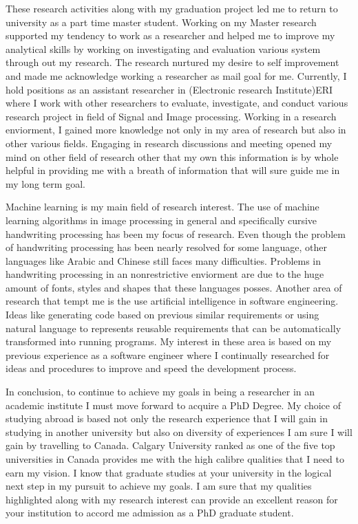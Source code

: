 \documentclass[a4paper,12pt]{article}%
\begin{document}
 These research activities along with my graduation project led me to return to university as a part time master student.  Working on my Master research supported my tendency to work as a researcher and helped me to improve my analytical skills by working on investigating and evaluation various system through out my research. The research nurtured my desire to self improvement and made me acknowledge working a researcher as mail goal for me. Currently, I hold positions as an assistant researcher in (Electronic research Institute)ERI where I work with other researchers to evaluate, investigate, and conduct  various research project in field of Signal and Image processing. Working in a research enviorment, I gained more knowledge not only in my area of research but also in other various fields. Engaging in research discussions and meeting opened my mind  on other field of research other that my own this information is by whole helpful in providing me with  a breath of information that will sure guide me in my long term goal.  
 
 
 Machine learning is my main field of research interest. The use of machine learning algorithms in image processing in general and specifically cursive handwriting processing has been my focus of research. Even though the problem of handwriting processing has been nearly resolved for some language, other languages like Arabic and Chinese still faces many difficulties. Problems in handwriting processing in an nonrestrictive enviorment are due to the huge amount of fonts, styles and shapes that these languages posses. Another area of research that tempt me is the use artificial intelligence in software engineering. Ideas like  generating code based on previous similar requirements or  using natural language to represents reusable requirements that can be automatically transformed into running programs. My interest in these area is based on my previous experience as a software engineer where I continually researched for ideas and procedures to improve and speed the development process.        
 
 
  In conclusion, to continue to achieve my goals in being a researcher in an academic institute I must move forward to acquire a PhD Degree. My choice of studying abroad is based not only the research experience that I will gain in  studying in another university but also on diversity of experiences I am sure I will gain by travelling to Canada. Calgary University ranked as one of the five top universities in Canada provides me with the high calibre qualities that I need to earn my vision. I know that graduate studies at your university in the logical next step in my pursuit to achieve my goals. I am sure that my qualities highlighted along with my research interest can provide an excellent reason for your institution to accord me admission as  a PhD graduate student.


\end{document}
